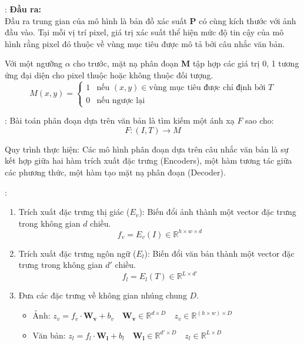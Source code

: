 \begin{frame}{\secname: \subsecname}
    \textbf{Đầu ra:} \\
    Đầu ra trung gian của mô hình là bản đồ xác suất \textbf{P} có cùng kích thước với ảnh đầu vào. Tại mỗi vị trí pixel, giá trị xác suất thể hiện mức độ tin cậy của mô hình rằng pixel đó thuộc về vùng mục tiêu được mô tả bởi câu nhắc văn bản.

    Với một ngưỡng $\alpha$ cho trước, mặt nạ phân đoạn \textbf{M} tập hợp các giá trị 0, 1 tương ứng đại diện cho pixel thuộc hoặc không thuộc đối tượng.
    $$
    M(x, y) =
        \begin{cases}
        1 & \text{nếu } (x, y) \in \text{vùng mục tiêu được chỉ định bởi } T \\
        0 & \text{nếu ngược lại}
        \end{cases}
    $$
\end{frame}

\begin{frame}{\secname: \subsecname}
    Bài toán phân đoạn dựa trên văn bản là tìm kiếm một ánh xạ $F$ sao cho:
    $$ F: (I, T) \rightarrow M$$

    \bigskip
    Quy trình thực hiện: Các mô hình phân đoạn dựa trên câu nhắc văn bản là sự kết hợp giữa hai hàm trích xuất đặc trưng (Encoders), một hàm tương tác giữa các phương thức, một hàm tạo mặt nạ phân đoạn (Decoder).
\end{frame}

\begin{frame}{\secname: \subsecname}
    \begin{enumerate}
        \item Trích xuất đặc trưng thị giác ($E_v$): Biến đổi ảnh thành một vector đặc trưng trong không gian $d$ chiều.
        $$f_v = E_v(I) \in \mathbb{R}^{h \times w \times d}$$
        \item Trích xuất đặc trưng ngôn ngữ ($E_l$): Biến đổi văn bản thành một vector đặc trưng trong không gian $d'$ chiều.
        $$ f_l = E_l(T) \in \mathbb{R}^{L \times d'}$$
        \item Đưa các đặc trưng về không gian nhúng chung $D$.
        \begin{itemize}
            \item Ảnh: $z_v = f_v \cdot \boldsymbol{W_v} + b_v \quad \boldsymbol{W_v} \in \mathbb{R}^{d \times D} \quad z_v \in \mathbb{R}^{(h \times w) \times D}$
            \item Văn bản: $z_l = f_l \cdot \boldsymbol{W_l} + b_l \quad \boldsymbol{W_l} \in \mathbb{R}^{d' \times D} \quad z_l \in \mathbb{R}^{L \times D}$
        \end{itemize}
        \setcounter{saveenumi}{\value{enumi}}
    \end{enumerate}
\end{frame}

